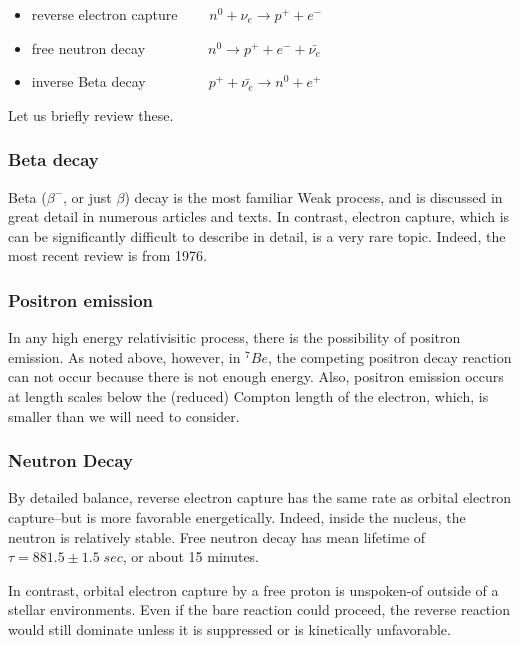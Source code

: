 \documentclass[%
 aip,
 jmp,%
 amsmath,amssymb,
 reprint,%
]{revtex4-1}
\begin{document}
\begin{itemize}
\item reverse electron capture  $\;\;\;\;\;\;\;n^{0}+\nu_{e}\rightarrow p^{+}+e^{-}$
\item free neutron decay  $\;\;\;\;\;\;\;\;\;\;\;\;\;\;\;n^{0}\rightarrow p^{+}+e^{-}+\bar{\nu_{e}}$ 
\item inverse Beta decay  $\;\;\;\;\;\;\;\;\;\;\;\;\;\;\;p^{+}+\bar{\nu_{e}} \rightarrow n^{0}+e^{+}$
\end{itemize}

Let us briefly review these.

\subsubsection{Beta decay} 

Beta ($\beta^{-}$, or just $\beta$) decay is the most familiar Weak process, and is discussed in great detail in numerous articles and texts. In contrast, electron capture, which is can be significantly difficult to describe in detail, is a very rare topic.  Indeed, the most recent review is from 1976.\cite{ec-review1}

\subsubsection{Positron emission} 

In any high energy relativisitic process, there is the possibility of positron emission.  As noted above, however, in $^{7}Be$, the competing positron decay reaction can not occur because there is not enough energy.  Also, positron emission occurs at length scales below the (reduced) Compton length of the electron, which, is smaller than we will need to consider.

\subsubsection{Neutron Decay} 

By detailed balance,  reverse electron capture has the same rate as orbital electron capture--but is more favorable energetically.  Indeed, inside the nucleus, the neutron is relatively stable. Free neutron decay has mean lifetime of $\tau=881.5\pm1.5\;sec $, or about 15 minutes. 

In contrast, orbital electron capture by a free proton is unspoken-of outside of a stellar environments. Even if the bare reaction could proceed, the reverse reaction would still dominate unless it is suppressed or is kinetically unfavorable.  
\end{document}
